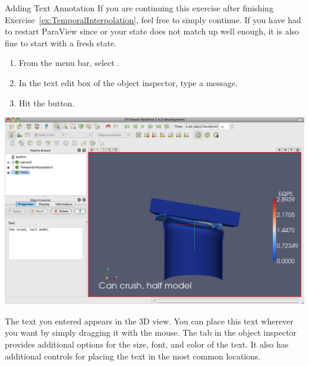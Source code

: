 \begin{exercise}{Adding Text Annotation}
  \label{ex:AddingTextAnnotation}%
  If you are continuing this exercise after finishing
  Exercise~\ref{ex:TemporalInterpolation}, feel free to simply continue.
  If you have had to restart ParaView since or your state does not match up
  well enough, it is also fine to start with a fresh state.

  \begin{enumerate}
  \item From the menu bar, select  \ra {}.
  \item In the text edit box of the object inspector, type a message.
  \item Hit the \apply button.
  \end{enumerate}

  \begin{inlinefig}
    \includegraphics[width=\scw]{images/TextSource}
  \end{inlinefig}

  The text you entered appears in the 3D view.  You can place this text
  wherever you want by simply dragging it with the mouse.  The
   tab in the object inspector provides additional options for
  the size, font, and color of the text.  It also has additional controls
  for placing the text in the most common locations.


\end{exercise}
